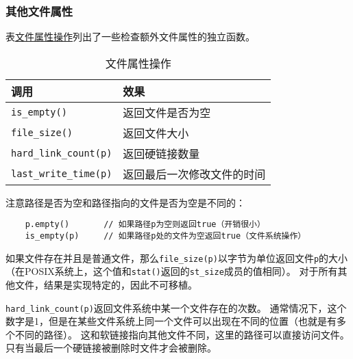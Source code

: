 \subsubsection{其他文件属性}
表\hyperref[t20.11]{文件属性操作}列出了一些检查额外文件属性的独立函数。
\begin{table}[htb]
    \centering
    \begin{tabular}{l|l}
        \hline
        \textbf{调用}                   & \textbf{效果}   \\
        \hline
        \texttt{is\_empty()}          & 返回文件是否为空      \\
        \texttt{file\_size()}         & 返回文件大小        \\
        \texttt{hard\_link\_count(p)} & 返回硬链接数量       \\
        \texttt{last\_write\_time(p)} & 返回最后一次修改文件的时间 \\
        \hline
    \end{tabular}
    \caption{文件属性操作}
    \label{t20.11}
\end{table}

注意路径是否为空和路径指向的文件是否为空是不同的：
\begin{lstlisting}
    p.empty()       // 如果路径p为空则返回true（开销很小）
    is_empty(p)     // 如果路径p处的文件为空返回true（文件系统操作）
\end{lstlisting}
如果文件存在并且是普通文件，那么\texttt{file\_size(p)}以字节为单位返回文件\texttt{p}的大小
（在POSIX系统上，这个值和\texttt{stat()}返回的\texttt{st\_size}成员的值相同）。
对于所有其他文件，结果是实现特定的，因此不可移植。

\texttt{hard\_link\_count(p)}返回文件系统中某一个文件存在的次数。
通常情况下，这个数字是1，但是在某些文件系统上同一个文件可以出现在不同的位置（也就是有多个不同的路径）。
这和软链接指向其他文件不同，这里的路径可以直接访问文件。只有当最后一个硬链接被删除时文件才会被删除。

